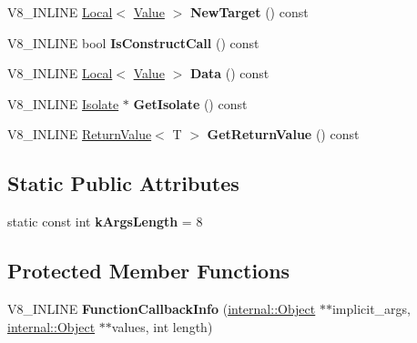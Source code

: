 \begin{DoxyCompactItemize}
\item 
V8\+\_\+\+I\+N\+L\+I\+NE \hyperlink{classv8_1_1_local}{Local}$<$ \hyperlink{classv8_1_1_value}{Value} $>$ {\bfseries New\+Target} () const \hypertarget{classv8_1_1_function_callback_info_a11cd0cd24b181bc6d39c3d0e203c2eee}{}\label{classv8_1_1_function_callback_info_a11cd0cd24b181bc6d39c3d0e203c2eee}

\item 
V8\+\_\+\+I\+N\+L\+I\+NE bool {\bfseries Is\+Construct\+Call} () const \hypertarget{classv8_1_1_function_callback_info_a8b89715c355b707efd3d2bcf21e64d9e}{}\label{classv8_1_1_function_callback_info_a8b89715c355b707efd3d2bcf21e64d9e}

\item 
V8\+\_\+\+I\+N\+L\+I\+NE \hyperlink{classv8_1_1_local}{Local}$<$ \hyperlink{classv8_1_1_value}{Value} $>$ {\bfseries Data} () const \hypertarget{classv8_1_1_function_callback_info_a1475dcc776c8fdd68eb1be08cd29e5ac}{}\label{classv8_1_1_function_callback_info_a1475dcc776c8fdd68eb1be08cd29e5ac}

\item 
V8\+\_\+\+I\+N\+L\+I\+NE \hyperlink{classv8_1_1_isolate}{Isolate} $\ast$ {\bfseries Get\+Isolate} () const \hypertarget{classv8_1_1_function_callback_info_a3b5fe01205c99dca06e388c3d390a40e}{}\label{classv8_1_1_function_callback_info_a3b5fe01205c99dca06e388c3d390a40e}

\item 
V8\+\_\+\+I\+N\+L\+I\+NE \hyperlink{classv8_1_1_return_value}{Return\+Value}$<$ T $>$ {\bfseries Get\+Return\+Value} () const \hypertarget{classv8_1_1_function_callback_info_abf851b51557b0507ab69c494fddbb3c3}{}\label{classv8_1_1_function_callback_info_abf851b51557b0507ab69c494fddbb3c3}

\end{DoxyCompactItemize}
\subsection*{Static Public Attributes}
\begin{DoxyCompactItemize}
\item 
static const int {\bfseries k\+Args\+Length} = 8\hypertarget{classv8_1_1_function_callback_info_a1e5248c2d40840270829882feaaa9d34}{}\label{classv8_1_1_function_callback_info_a1e5248c2d40840270829882feaaa9d34}

\end{DoxyCompactItemize}
\subsection*{Protected Member Functions}
\begin{DoxyCompactItemize}
\item 
V8\+\_\+\+I\+N\+L\+I\+NE {\bfseries Function\+Callback\+Info} (\hyperlink{classv8_1_1internal_1_1_object}{internal\+::\+Object} $\ast$$\ast$implicit\+\_\+args, \hyperlink{classv8_1_1internal_1_1_object}{internal\+::\+Object} $\ast$$\ast$values, int length)\hypertarget{classv8_1_1_function_callback_info_ad479ef760ed88d4354c267d2068deaca}{}\label{classv8_1_1_function_callback_info_ad479ef760ed88d4354c267d2068deaca}

\end{DoxyCompactItemize}
